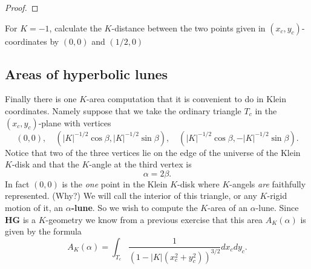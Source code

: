 \documentclass{ximera}
\begin{document}
\begin{proof}
\end{proof}

\begin{exercise}
For $K=-1$, calculate the $K$-distance between the two points given in
$\left(  x_{c},y_{c}\right)  $-coordinates by $\left(  0,0\right)  $ and
$\left(  1/2,0\right)  $
\end{exercise}

\subsection*{Areas of hyperbolic lunes}

Finally there is one $K$-area computation that it is convenient to do in Klein
coordinates. Namely suppose that we take the ordinary triangle $T_{c}$ in the
$\left(  x_{c},y_{c}\right)  $-plane with vertices 
\[
\left(  0,0\right),\quad \left(  \left\vert K\right\vert ^{-1/2}\cos \beta,\left\vert K\right\vert ^{-1/2}\sin \beta\right),\quad \left(  \left\vert
K\right\vert ^{-1/2}\cos \beta,-\left\vert K\right\vert ^{-1/2}%
\sin \beta\right).
\]
Notice that two of the three vertices lie on the edge of the universe
of the Klein $K$-disk and that the $K$-angle at the third vertex is%
\[
\alpha=2\beta.
\]
In fact $\left(  0,0\right)  $ is the \textit{one} point in the Klein
$K$-disk where $K$-angels \textit{are} faithfully represented. (Why?) We will
call the interior of this triangle, or any $K$-rigid motion of it, an $\alpha
$\textbf{-lune}. So we wish to compute the $K$-area of an $\alpha$-lune. Since
\textbf{HG} is a $K$-geometry we know from a previous exercise%
that this area
$A_{K}\left(  \alpha\right)  $ is given by the formula%
\[
A_{K}\left(  \alpha\right)  =%
{\displaystyle\int\nolimits_{T_{c}}}
\frac{1}{\left(  1-\left\vert K\right\vert \left(  x_{c}^{2}+y_{c}^{2}\right)
\right)  ^{3/2}}dx_{c}dy_{c}.
\]
\end{document}
